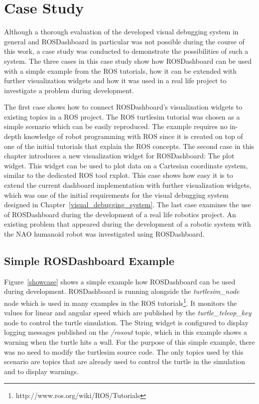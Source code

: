 \chapter{Case Study}
\label{case_study_chapter}
Although a thorough evaluation of the developed visual debugging system in general and ROSDashboard in particular was not possible during the course of this work, a case study was conducted to demonstrate the possibilities of such a system. The three cases in this case study show how ROSDashboard can be used with a simple example from the ROS tutorials, how it can be extended with further visualization widgets and how it was used in a real life project to investigate a problem during development.

The first case shows how to connect ROSDashboard's visualization widgets to existing topics in a ROS project. The ROS turtlesim tutorial was chosen as a simple scenario which can be easily reproduced. The example requires no in-depth knowledge of robot programming with ROS since it is created on top of one of the initial tutorials that explain the ROS concepts. The second case in this chapter introduces a new visualization widget for ROSDashboard: The plot widget. This widget can be used to plot data on a Cartesian coordinate system, similar to the dedicated ROS tool rxplot. This case shows how easy it is to extend the current dashboard implementation with further visualization widgets, which was one of the initial requirements for the visual debugging system designed in Chapter~\ref{visual_debugging_system}. The last case examines the use of ROSDashboard during the development of a real life robotics project. An existing problem that appeared during the development of a robotic system with the NAO humanoid robot was investigated using ROSDashboard.

\section{Simple ROSDashboard Example}
Figure~\ref{showcase} shows a simple example how ROSDashboard can be used during development. ROSDashboard is running alongside the \emph{turtlesim\_node} node which is used in many examples in the ROS tutorials\footnote{http://www.ros.org/wiki/ROS/Tutorials}. It monitors the values for linear and angular speed which are published by the \emph{turtle\_teleop\_key} node to control the turtle simulation. The String widget is configured to display logging messages published on the \emph{/rosout} topic, which in this example shows a warning when the turtle hits a wall. For the purpose of this simple example, there was no need to modify the turtlesim source code. The only topics used by this scenario are topics that are already used to control the turtle in the simulation and to display warnings.

